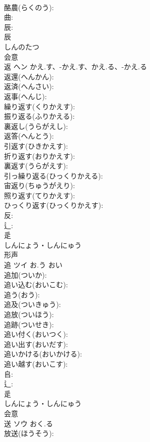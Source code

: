 \documentclass[8pt]{extreport}
\begin{document}
\begin{CJK}{UTF8}{min}
\\	酪農(らくのう): 
\\	曲: 
\\	辰: 
\\	辰	
\\	しんのたつ	
\\	会意 
\\	返	ヘン	かえ.す、-かえ.す、かえ.る、-かえ.る		
\\	返還(へんかん): 
\\	返済(へんさい): 
\\	返事(へんじ): 
\\	繰り返す(くりかえす): 
\\	振り返る(ふりかえる): 
\\	裏返し(うらがえし): 
\\	返答(へんとう): 
\\	引返す(ひきかえす): 
\\	折り返す(おりかえす): 
\\	裏返す(うらがえす): 
\\	引っ繰り返る(ひっくりかえる): 
\\	宙返り(ちゅうがえり): 
\\	照り返す(てりかえす): 
\\	ひっくり返す(ひっくりかえす): 
\\	反: 
\\	辶: 
\\	辵	
\\	しんにょう・しんにゅう	
\\	形声 
\\	追	ツイ	お.う	おい	
\\	追加(ついか): 
\\	追い込む(おいこむ): 
\\	追う(おう): 
\\	追及(ついきゅう): 
\\	追放(ついほう): 
\\	追跡(ついせき): 
\\	追い付く(おいつく): 
\\	追い出す(おいだす): 
\\	追いかける(おいかける): 
\\	追い越す(おいこす): 
\\	𠂤: 
\\	辶: 
\\	辵	
\\	しんにょう・しんにゅう	
\\	会意 
\\	送	ソウ	おく.る		
\\	放送(ほうそう): 

\end{CJK}
\end{document}
